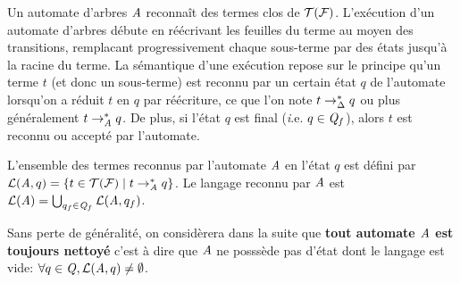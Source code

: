 Un automate d'arbres $\mathit A$ reconnaît des termes clos de $\mathcal{T(F)}$. L'exécution d'un automate d'arbres
débute en réécrivant les feuilles du terme au moyen des transitions, remplacant progressivement
chaque sous-terme par des états jusqu'à la racine du terme. La sémantique d'une exécution 
repose sur le principe qu'un terme $t$ (et donc un sous-terme) est reconnu par un certain état $q$ de l'automate lorsqu'on a
réduit $t$ en $q$ par réécriture, ce que l'on note $t \rightarrow_\Delta^* q$ ou plus généralement $t \rightarrow_\mathit A^* q$. De plus, si l'état $q$
est final (\textit i.e. $q \in \mathit Q_f$), alors $t$ est reconnu ou accepté par l'automate.

\begin{definition}
  L'ensemble des termes reconnus par l'automate $\mathit A$ en l'état $q$ est défini par $\mathcal{L}(\mathit A, q) = \{ t \in \mathcal{T(F)} \; | \; t \rightarrow_\mathit A^* q\}$.
  Le langage reconnu par $\mathit A$ est $\mathcal{L}(\mathit A) = \bigcup_{q_f\in \mathit Q_f} \mathcal{L}(\mathit A, q_f)$. 
\end{definition}
Sans perte de généralité, on considèrera dans la suite que \textbf{tout automate $\mathit A$ est toujours nettoyé}
c'est à dire que $\mathit A$ ne posssède pas d'état dont le langage est vide: $\forall q \in \mathit Q, \mathcal{L}(\mathit A, q) \not= \emptyset$.

